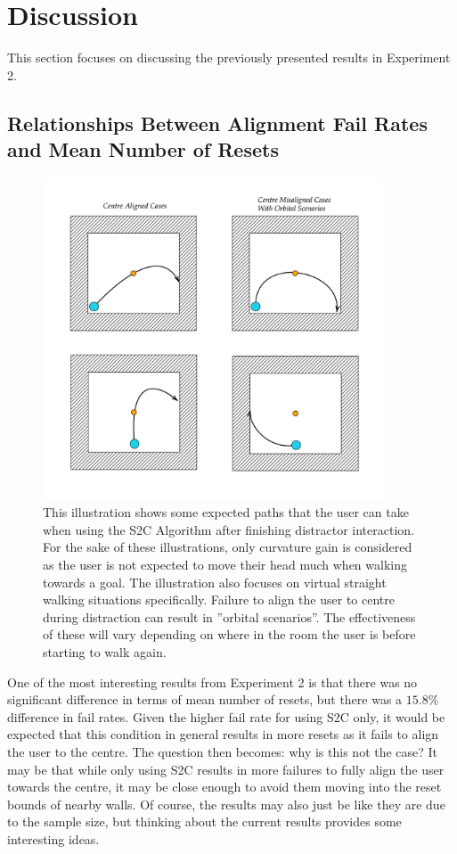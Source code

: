 \section{Discussion}
This section focuses on discussing the previously presented results in Experiment 2.

\subsection{Relationships Between Alignment Fail Rates and Mean Number of Resets}\label{sec:orbitalCases}
\begin{figure}[tbph]
    \centering
    \includegraphics[width=0.9\textwidth]{figures/graphs/orbitalcases.png}
    \caption[Illustration of Various S2C Redirection Scenarios During Success/Failure of Centre Alignment]{This illustration shows some expected paths that the user can take when using the S2C Algorithm after finishing distractor interaction. For the sake of these illustrations, only curvature gain is considered as the user is not expected to move their head much when walking towards a goal. The illustration also focuses on virtual straight walking situations specifically. Failure to align the user to centre during distraction can result in ''orbital scenarios''. The effectiveness of these will vary depending on where in the room the user is before starting to walk again.}
    \label{fig:orbitalCases}
\end{figure}

One of the most interesting results from Experiment 2 is that there was no significant difference in terms of mean number of resets, but there was a $15.8\%$ difference in fail rates. Given the higher fail rate for using S2C only, it would be expected that this condition in general results in more resets as it fails to align the user to the centre. The question then becomes: why is this not the case? It may be that while only using S2C results in more failures to fully align the user towards the centre, it may be close enough to avoid them moving into the reset bounds of nearby walls. Of course, the results may also just be like they are due to the sample size, but thinking about the current results provides some interesting ideas. 

